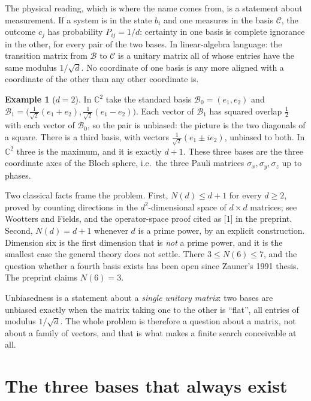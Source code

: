 \documentclass[11pt]{article}
\theoremstyle{definition}
\newtheorem{example}[definition]{Example}
\theoremstyle{plain}
\theoremstyle{definition}
\newcommand{\C}{\mathbb{C}}
\begin{document}
The physical reading, which is where the name comes from, is a statement about measurement. If a
system is in the state $b_i$ and one measures in the basis $\mathcal C$, the outcome $c_j$ has
probability $P_{ij}=1/d$: certainty in one basis is complete ignorance in the other, for every
pair of the two bases. In linear-algebra language: the transition matrix from $\mathcal B$ to
$\mathcal C$ is a unitary matrix all of whose entries have the same modulus $1/\sqrt d$. No
coordinate of one basis is any more aligned with a coordinate of the other than any other
coordinate is.

\begin{example}[$d=2$]\label{ex:d2}
In $\C^2$ take the standard basis $\mathcal B_0=(e_1,e_2)$ and $\mathcal B_1=\bigl(\tfrac1{\sqrt2}(e_1+e_2),\tfrac1{\sqrt2}(e_1-e_2)\bigr)$.
Each vector of $\mathcal B_1$ has squared overlap $\tfrac12$ with each vector of $\mathcal B_0$, so the pair is
unbiased: the picture is the two diagonals of a square. There is a third basis, with vectors
$\tfrac1{\sqrt2}(e_1\pm ie_2)$, unbiased to both. In $\C^2$ three is the maximum, and it is exactly
$d+1$. These three bases are the three coordinate axes of the Bloch sphere, i.e.\ the three Pauli
matrices $\sigma_x,\sigma_y,\sigma_z$ up to phases.
\end{example}

Two classical facts frame the problem. First, $N(d)\le d+1$ for every $d\ge2$, proved by counting
directions in the $d^2$-dimensional space of $d\times d$ matrices; see Wootters and Fields, and the
operator-space proof cited as [1] in the preprint. Second, $N(d)=d+1$ whenever $d$ is a prime power, by
an explicit construction. Dimension six is the first dimension that is \emph{not} a prime power, and
it is the smallest case the general theory does not settle. There $3\le N(6)\le 7$, and the question
whether a fourth basis exists has been open since Zauner's 1991 thesis. The preprint claims $N(6)=3$.

\begin{ideabox}
Unbiasedness is a statement about a \emph{single unitary matrix}: two bases are unbiased exactly
when the matrix taking one to the other is ``flat'', all entries of modulus $1/\sqrt d$. The whole
problem is therefore a question about a matrix, not about a family of vectors, and that is what
makes a finite search conceivable at all.
\end{ideabox}

\section{The three bases that always exist}\label{sec:lower}
\end{document}
